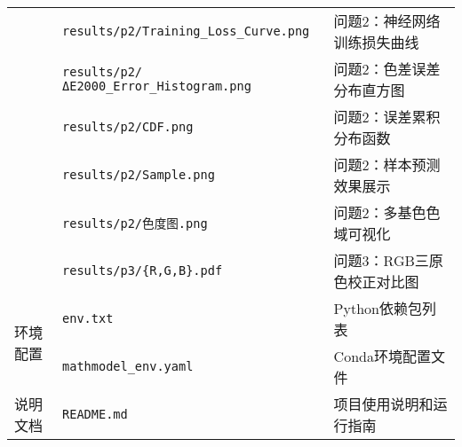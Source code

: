 \begin{table}[h!]
\begin{tabularx}{\textwidth}{p{1.8cm}p{4.2cm}X}
 & \texttt{results/p2/}\newline\texttt{Training\_Loss\_Curve.png} & 问题2：神经网络训练损失曲线 \\
 & \texttt{results/p2/}\newline\texttt{ΔE2000\_Error\_Histogram.png} & 问题2：色差误差分布直方图 \\
 & \texttt{results/p2/CDF.png} & 问题2：误差累积分布函数 \\
 & \texttt{results/p2/Sample.png} & 问题2：样本预测效果展示 \\
 & \texttt{results/p2/色度图.png} & 问题2：多基色色域可视化 \\
 & \texttt{results/p3/\{R,G,B\}.pdf} & 问题3：RGB三原色校正对比图 \\
\midrule
\multirow{2}{1.8cm}{环境配置} & \texttt{env.txt} & Python依赖包列表 \\
 & \texttt{mathmodel\_env.yaml} & Conda环境配置文件 \\
\midrule
说明文档 & \texttt{README.md} & 项目使用说明和运行指南 \\
\bottomrule
\end{tabularx}
\label{table:supporting_materials}
\end{table}

